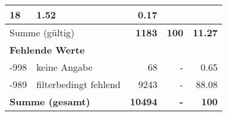 \begin{longtable}{lXrrr}
       \num{18} &
       \num[round-mode=places,round-precision=2]{1.52} &
         \num[round-mode=places,round-precision=2]{0.17} \\
     \midrule
     \multicolumn{2}{l}{Summe (gültig)} &
       \textbf{\num{1183}} &
     \textbf{\num{100}} &
       \textbf{\num[round-mode=places,round-precision=2]{11.27}} \\
     \multicolumn{5}{l}{\textbf{Fehlende Werte}}\\
       -998 &
       keine Angabe &
         \num{68} &
        - &
         \num[round-mode=places,round-precision=2]{0.65} \\
       -989 &
       filterbedingt fehlend &
         \num{9243} &
        - &
         \num[round-mode=places,round-precision=2]{88.08} \\
     \midrule
     \multicolumn{2}{l}{\textbf{Summe (gesamt)}} &
          \textbf{\num{10494}} &
        \textbf{-} &
        \textbf{\num{100}} \\
     \bottomrule
     \end{longtable}
     
